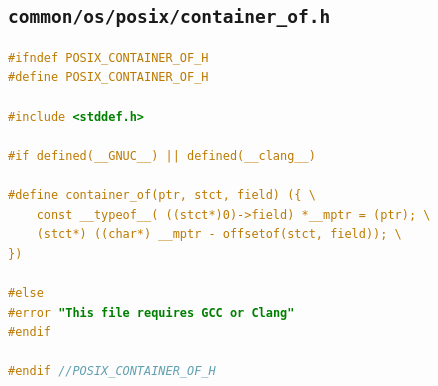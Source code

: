 \documentclass[12pt,a4paper,oneside,fleqn]{article}
\begin{document}
\subsection*{\texttt{common/os/posix/container\_of.h}}
\begin{lstlisting}[language=C]
#ifndef POSIX_CONTAINER_OF_H
#define POSIX_CONTAINER_OF_H

#include <stddef.h>

#if defined(__GNUC__) || defined(__clang__)

#define container_of(ptr, stct, field) ({ \
    const __typeof__( ((stct*)0)->field) *__mptr = (ptr); \
    (stct*) ((char*) __mptr - offsetof(stct, field)); \
})

#else
#error "This file requires GCC or Clang"
#endif

#endif //POSIX_CONTAINER_OF_H
\end{lstlisting}
\end{document}
